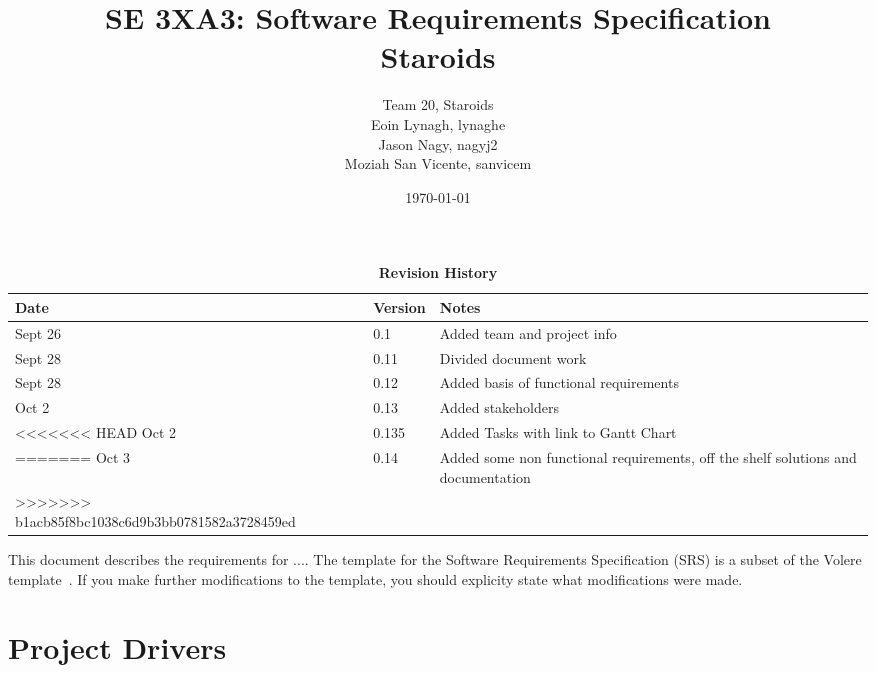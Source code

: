 \documentclass[12pt, titlepage]{article}
\title{SE 3XA3: Software Requirements Specification\\Staroids}
\author{Team 20, Staroids
		\\ Eoin Lynagh, lynaghe
		\\ Jason Nagy, nagyj2
		\\ Moziah San Vicente, sanvicem
}
\date{\today}
\begin{document}
\maketitle

\tableofcontents
\listoftables
\listoffigures

\begin{table}[bp]
\caption{\bf Revision History}
\begin{tabularx}{\textwidth}{p{3cm}p{2cm}X}
\toprule {\bf Date} & {\bf Version} & {\bf Notes}\\
\midrule
Sept 26 & 0.1 & Added team and project info\\
Sept 28 & 0.11 & Divided document work\\
Sept 28 & 0.12 & Added basis of functional requirements\\
Oct 2 & 0.13 & Added stakeholders\\
<<<<<<< HEAD
Oct 2 & 0.135 & Added Tasks with link to Gantt Chart\\
=======
Oct 3 & 0.14 & Added some non functional requirements, off the shelf solutions and documentation\\
>>>>>>> b1acb85f8bc1038c6d9b3bb0781582a3728459ed
\bottomrule
\end{tabularx}
\end{table}

\newpage






This document describes the requirements for ....  The template for the Software
Requirements Specification (SRS) is a subset of the Volere
template~\citep{RobertsonAndRobertson2012}.  If you make further modifications
to the template, you should explicity state what modifications were made.

\section{Project Drivers}
\end{document}
